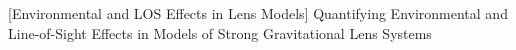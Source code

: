 [Environmental and LOS Effects in Lens Models]
{Quantifying Environmental and Line-of-Sight Effects in Models of Strong Gravitational Lens Systems}